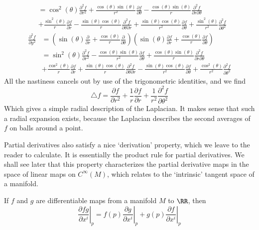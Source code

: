 \begin{example}
\begin{align*}
        &= \cos^2(\theta) \frac{\partial^2 f}{\partial r^2} + \frac{\cos(\theta) \sin(\theta)}{r^2} \frac{\partial f}{\partial \theta} - \frac{\cos(\theta) \sin(\theta)}{r} \frac{\partial^2 f}{\partial r \partial \theta}\\
        &+ \frac{\sin^2(\theta)}{r} \frac{\partial f}{\partial r} - \frac{\sin(\theta) \cos(\theta)}{r} \frac{\partial^2 f}{\partial \theta \partial r} + \frac{\sin(\theta) \cos(\theta)}{r^2} \frac{\partial f}{\partial \theta} + \frac{\sin^2(\theta)}{r^2} \frac{\partial^2 f}{\partial \theta^2}
    \end{align*}
    \begin{align*}
        \frac{\partial^2 f}{\partial y^2} &= \left( \sin(\theta) \frac{\partial}{\partial r} + \frac{\cos(\theta)}{r} \frac{\partial}{\partial \theta} \right) \left( \sin(\theta) \frac{\partial f}{\partial r} + \frac{\cos(\theta)}{r} \frac{\partial f}{\partial \theta} \right)\\
        &= \sin^2(\theta) \frac{\partial^2 f}{\partial r^2} - \frac{\cos(\theta) \sin(\theta)}{r^2} \frac{\partial f}{\partial \theta} + \frac{\cos(\theta) \sin(\theta)}{r} \frac{\partial^2 f}{\partial r \partial \theta}\\
        &+ \frac{\cos^2(\theta)}{r} \frac{\partial f}{\partial r} + \frac{\sin(\theta) \cos(\theta)}{r} \frac{\partial^2 f}{\partial \theta \partial r} - \frac{\sin(\theta) \cos(\theta)}{r^2} \frac{\partial f}{\partial \theta} + \frac{\cos^2(\theta)}{r^2} \frac{\partial^2 f}{\partial \theta^2}
    \end{align*}
    All the nastiness cancels out by use of the trigonometric identities, and we find
    \[ \bigtriangleup f = \frac{\partial f}{\partial r^2} + \frac{1}{r} \frac{\partial f}{\partial r} + \frac{1}{r^2} \frac{\partial^2 f}{\partial \theta^2} \]
    Which gives a simple radial description of the Laplacian. It makes sense that such a radial expansion exists, because the Laplacian describes the second averages of $f$ on balls around a point.
\end{example}

Partial derivatives also satisfy a nice `derivation' property, which we leave to the reader to calculate. It is essentially the product rule for partial derivatives. We shall see later that this property characterizes the partial derivative maps in the space of linear maps on $C^\infty(M)$, which relates to the `intrinsic' tangent space of a manifold.

\begin{lemma}
    If $f$ and $g$ are differentiable maps from a manifold $M$ to $\RR$, then
    \[ \left.\frac{\partial fg}{\partial x^i}\right|_p = f(p)\left.\frac{\partial g}{\partial x^i}\right|_p + g(p)\left.\frac{\partial f}{\partial x^i}\right|_p  \]
\end{lemma}

